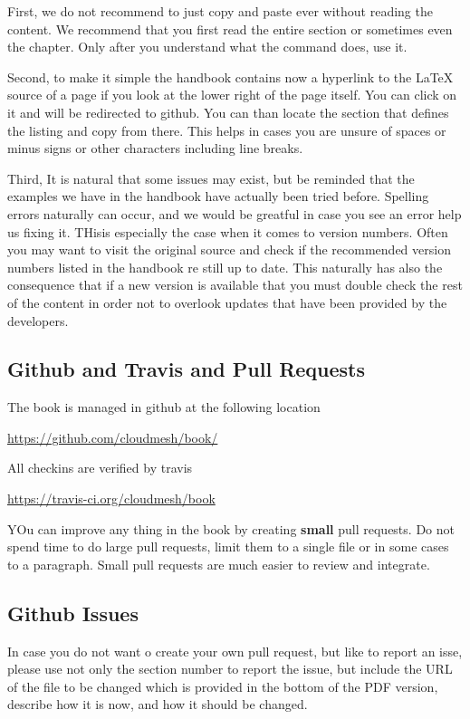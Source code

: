 First, we do not recommend to just copy and paste ever without reading
the content. We recommend that you first read the entire section or
sometimes even the chapter. Only after you understand what the command
does, use it.

Second, to make it simple the handbook contains now a hyperlink to the
LaTeX source of a page if you look at the lower right of the page
itself. You can click on it and will be redirected to github. You can
than locate the section that defines the listing and copy from
there. This helps in cases you are unsure of spaces or minus signs or
other characters including line breaks.

Third, It is natural that some issues may exist, but be reminded that
the examples we have in the handbook have actually been tried
before. Spelling errors naturally can occur, and we would be greatful
in case you see an error help us fixing it. THisis especially the case
when it comes to version numbers. Often you may want to visit the
original source and check if the recommended version numbers listed in
the handbook re still up to date. This naturally has also the
consequence that if a new version is available that you must double
check the rest of the content in order not to overlook updates that
have been provided by the developers.

\subsection{Github and Travis and Pull Requests}

The book is managed in github at the following location

\url{https://github.com/cloudmesh/book/}

All checkins are verified by travis

\url{https://travis-ci.org/cloudmesh/book}

YOu can improve any thing in the book by creating {\bf small} pull
requests. Do not spend time to do large pull requests, limit them to a
single file or in some cases to a paragraph. Small pull requests are
much easier to review and integrate.

\subsection{Github Issues}

In case you do not want o create your own pull request, but like to
report an isse, please use not only the section number to report the
issue, but include the URL of the file to be changed which is provided
in the bottom of the PDF version, describe how it is now, and how it
should be changed.

